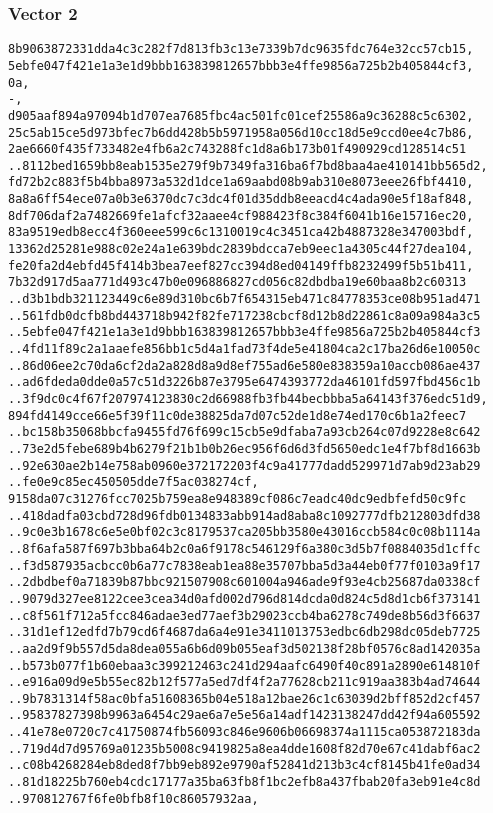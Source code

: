 \documentclass[
]{article}
\begin{document}
\hypertarget{vector-2-2}{%
\subsubsection{Vector 2}\label{vector-2-2}}

\begin{verbatim}
8b9063872331dda4c3c282f7d813fb3c13e7339b7dc9635fdc764e32cc57cb15,
5ebfe047f421e1a3e1d9bbb163839812657bbb3e4ffe9856a725b2b405844cf3,
0a,
-,
d905aaf894a97094b1d707ea7685fbc4ac501fc01cef25586a9c36288c5c6302,
25c5ab15ce5d973bfec7b6dd428b5b5971958a056d10cc18d5e9ccd0ee4c7b86,
2ae6660f435f733482e4fb6a2c743288fc1d8a6b173b01f490929cd128514c51
..8112bed1659bb8eab1535e279f9b7349fa316ba6f7bd8baa4ae410141bb565d2,
fd72b2c883f5b4bba8973a532d1dce1a69aabd08b9ab310e8073eee26fbf4410,
8a8a6ff54ece07a0b3e6370dc7c3dc4f01d35ddb8eeacd4c4ada90e5f18af848,
8df706daf2a7482669fe1afcf32aaee4cf988423f8c384f6041b16e15716ec20,
83a9519edb8ecc4f360eee599c6c1310019c4c3451ca42b4887328e347003bdf,
13362d25281e988c02e24a1e639bdc2839bdcca7eb9eec1a4305c44f27dea104,
fe20fa2d4ebfd45f414b3bea7eef827cc394d8ed04149ffb8232499f5b51b411,
7b32d917d5aa771d493c47b0e096886827cd056c82dbdba19e60baa8b2c60313
..d3b1bdb321123449c6e89d310bc6b7f654315eb471c84778353ce08b951ad471
..561fdb0dcfb8bd443718b942f82fe717238cbcf8d12b8d22861c8a09a984a3c5
..5ebfe047f421e1a3e1d9bbb163839812657bbb3e4ffe9856a725b2b405844cf3
..4fd11f89c2a1aaefe856bb1c5d4a1fad73f4de5e41804ca2c17ba26d6e10050c
..86d06ee2c70da6cf2da2a828d8a9d8ef755ad6e580e838359a10accb086ae437
..ad6fdeda0dde0a57c51d3226b87e3795e6474393772da46101fd597fbd456c1b
..3f9dc0c4f67f207974123830c2d66988fb3fb44becbbba5a64143f376edc51d9,
894fd4149cce66e5f39f11c0de38825da7d07c52de1d8e74ed170c6b1a2feec7
..bc158b35068bbcfa9455fd76f699c15cb5e9dfaba7a93cb264c07d9228e8c642
..73e2d5febe689b4b6279f21b1b0b26ec956f6d6d3fd5650edc1e4f7bf8d1663b
..92e630ae2b14e758ab0960e372172203f4c9a41777dadd529971d7ab9d23ab29
..fe0e9c85ec450505dde7f5ac038274cf,
9158da07c31276fcc7025b759ea8e948389cf086c7eadc40dc9edbfefd50c9fc
..418dadfa03cbd728d96fdb0134833abb914ad8aba8c1092777dfb212803dfd38
..9c0e3b1678c6e5e0bf02c3c8179537ca205bb3580e43016ccb584c0c08b1114a
..8f6afa587f697b3bba64b2c0a6f9178c546129f6a380c3d5b7f0884035d1cffc
..f3d587935acbcc0b6a77c7838eab1ea88e35707bba5d3a44eb0f77f0103a9f17
..2dbdbef0a71839b87bbc921507908c601004a946ade9f93e4cb25687da0338cf
..9079d327ee8122cee3cea34d0afd002d796d814dcda0d824c5d8d1cb6f373141
..c8f561f712a5fcc846adae3ed77aef3b29023ccb4ba6278c749de8b56d3f6637
..31d1ef12edfd7b79cd6f4687da6a4e91e3411013753edbc6db298dc05deb7725
..aa2d9f9b557d5da8dea055a6b6d09b055eaf3d502138f28bf0576c8ad142035a
..b573b077f1b60ebaa3c399212463c241d294aafc6490f40c891a2890e614810f
..e916a09d9e5b55ec82b12f577a5ed7df4f2a77628cb211c919aa383b4ad74644
..9b7831314f58ac0bfa51608365b04e518a12bae26c1c63039d2bff852d2cf457
..95837827398b9963a6454c29ae6a7e5e56a14adf1423138247dd42f94a605592
..41e78e0720c7c41750874fb56093c846e9606b06698374a1115ca053872183da
..719d4d7d95769a01235b5008c9419825a8ea4dde1608f82d70e67c41dabf6ac2
..c08b4268284eb8ded8f7bb9eb892e9790af52841d213b3c4cf8145b41fe0ad34
..81d18225b760eb4cdc17177a35ba63fb8f1bc2efb8a437fbab20fa3eb91e4c8d
..970812767f6fe0bfb8f10c86057932aa,
\end{verbatim}
\end{document}
